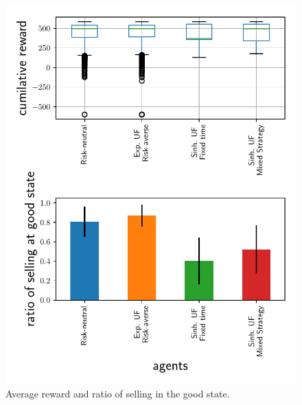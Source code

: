 
\begin{figure}
\includegraphics[width=0.8\linewidth]{img/performance.pdf}
\caption{Average reward and ratio of selling in the good state.}
\end{figure}
